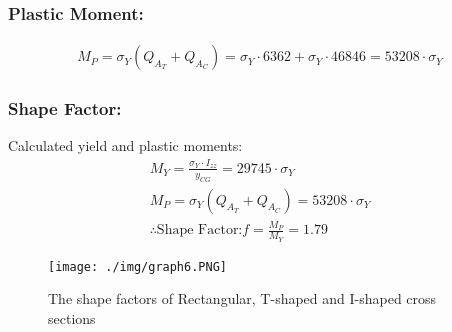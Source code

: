 \subsubsection{Plastic Moment:}
\begin{gather}
  M_P = \sigma_Y(Q_{A_T}+Q_{A_C}) = \sigma_Y\cdot 6362+\sigma_Y\cdot 46846 = 53208\cdot\sigma_Y
\end{gather}
\subsubsection{Shape Factor:}
Calculated yield and plastic moments:
\begin{gather}
  M_Y = \frac{\sigma_Y\cdot I_{zz}}{y_{CG}} = 29745\cdot\sigma_Y \\[10pt]
  M_P = \sigma_Y(Q_{A_T}+Q_{A_C}) = 53208\cdot\sigma_Y \\[10pt]
  \therefore \text{Shape Factor:}f=\frac{M_P}{M_Y} = 1.79
\end{gather}
\begin{figure}[H]
  \centering
  \texttt{[image: ./img/graph6.PNG]}
  \caption{The shape factors of Rectangular, T-shaped and I-shaped cross sections}
\end{figure}